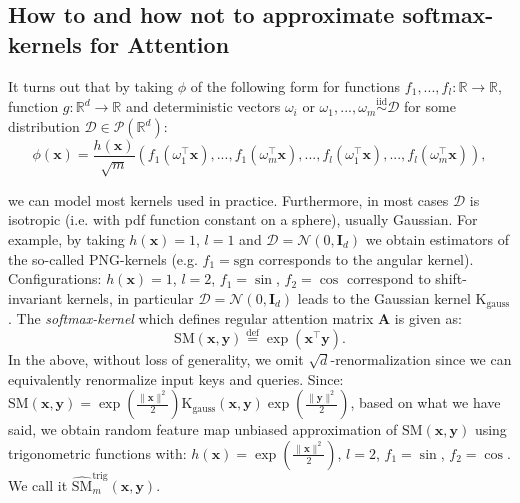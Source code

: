 \subsection{How to and how not to approximate softmax-kernels for Attention}
\label{howto}

It turns out that by taking $\phi$ of the following form
for functions $f_{1},...,f_{l}:\mathbb{R} \rightarrow \mathbb{R}$,
function $g:\mathbb{R}^{d} \rightarrow \mathbb{R}$ and deterministic vectors $\omega_{i}$ or $\omega_{1},...,\omega_{m} \overset{\mathrm{iid}}{\sim} \mathcal{D}$ for some distribution $\mathcal{D} \in \mathcal{P}(\mathbb{R}^{d})$:
\begin{equation} \label{eq:feature}
\phi(\mathbf{x}) = \frac{h(\mathbf{x})}{\sqrt{m}}
(f_{1}(\omega_{1}^{\top}\mathbf{x}),...,f_{1}(\omega_{m}^{\top}\mathbf{x}),...,f_{l}(\omega_{1}^{\top}\mathbf{x}),...,f_{l}(\omega_{m}^{\top}\mathbf{x})),    
\end{equation}

we can model most kernels used in practice. Furthermore, in most cases $\mathcal{D}$ is isotropic (i.e. with pdf function constant on a sphere), usually Gaussian. For example, by taking $h(\mathbf{x})=1$, $l=1$ and $\mathcal{D}=\mathcal{N}(0,\mathbf{I}_{d})$ we obtain estimators of the so-called PNG-kernels \citep{unreas} (e.g. $f_{1} = \mathrm{sgn}$ corresponds to the angular kernel).
Configurations: $h(\mathbf{x})=1$, $l=2$, $f_{1}=\sin$, $f_{2}=\cos$ correspond to shift-invariant kernels, in particular $\mathcal{D}=\mathcal{N}(0, \mathbf{I}_{d})$ leads to the Gaussian kernel $\mathrm{K}_{\mathrm{gauss}}$ \citep{fourierapprox}. The \textit{softmax-kernel} which defines regular attention matrix $\mathbf{A}$ is given as:
\vspace{-0.75mm}
\begin{equation}
\mathrm{SM}(\mathbf{x}, \mathbf{y}) \overset{\mathrm{def}}{=} \exp(\mathbf{x}^{\top}\mathbf{y}).    
\end{equation}
In the above, without loss of generality, we omit $\sqrt{d}$-renormalization since we can equivalently renormalize input keys and queries. Since: $\mathrm{SM}(\mathbf{x}, \mathbf{y}) = \exp(\frac{\|\mathbf{x}\|^{2}}{2})\mathrm{K}_{\mathrm{gauss}}(\mathbf{x},\mathbf{y})\exp(\frac{\|\mathbf{y}\|^{2}}{2})$, based on what we have said, we obtain random feature map unbiased approximation of $\mathrm{SM}(\mathbf{x}, \mathbf{y})$ using trigonometric functions with: $h(\mathbf{x})=\exp(\frac{\|\mathbf{x}\|^{2}}{2})$, $l=2$, $f_{1}=\sin$, $f_{2}=\cos$. We call it $\widehat{\mathrm{SM}}_{m}^{\mathrm{trig}}(\mathbf{x}, \mathbf{y})$. 

